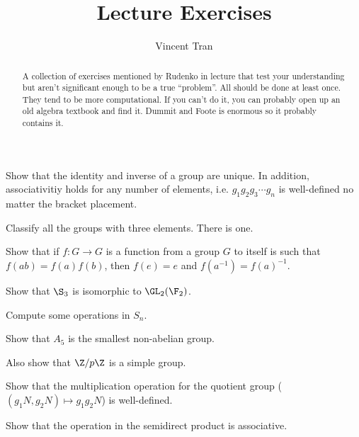 \documentclass{amsart}
\title{Lecture Exercises}
\author{Vincent Tran}
\begin{document}
\begin{abstract}
	A collection of exercises mentioned by Rudenko in lecture that test your understanding but aren't significant enough to be a true ``problem''.
	All should be done at least once.
	They tend to be more computational.
	If you can't do it, you can probably open up an old algebra textbook and find it.
	Dummit and Foote is enormous so it probably contains it.
\end{abstract}

\maketitle

\begin{exercise}
	Show that the identity and inverse of a group are unique.
	In addition, associativitiy holds for any number of elements, i.e. $g_{1}g_{2}g_{3}\cdots g_n $ is well-defined no matter the bracket placement.
\end{exercise}

\begin{exercise}
	Classify all the groups with three elements.
	\ifhint
		There is one.
	\fi
\end{exercise}

\begin{exercise}
	Show that if $f: G\to G $ is a function from a group $G $ to itself is such that $f(ab) = f(a) f(b) $, then $f(e) = e $ and $f(a^{-1}) = f(a)^{-1} $.
\end{exercise}

\begin{exercise}
	Show that $\S_3 $ is isomorphic to $\GL_2(\F_2) $.
\end{exercise}

\begin{exercise}
	Compute some operations in $S_n $.
\end{exercise}

\begin{exercise}
	Show that $A_5 $ is the smallest non-abelian group.

	Also show that $\Z / p\Z $ is a simple group.
\end{exercise}

\begin{exercise}
	Show that the multiplication operation for the quotient group ($(g_{1}N,g_{2}N) \mapsto g_{1}g_{2}N $) is well-defined.
\end{exercise}

\begin{exercise}
	Show that the operation in the semidirect product is associative.
\end{exercise}
\end{document}
